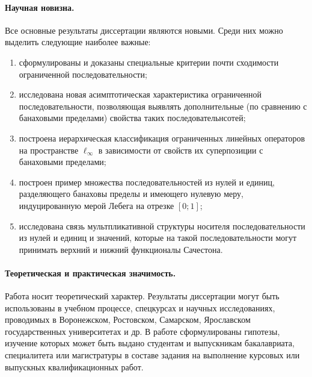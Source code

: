\paragraph{Научная новизна.}
Все основные результаты диссертации являются новыми.
Среди них можно выделить следующие наиболее важные:
\begin{enumerate}
	\item
		сформулированы и доказаны специальные критерии почти сходимости
		ограниченной последовательности;
	\item
		исследована новая асимптотическая характеристика ограниченной последовательности,
		позволяющая выявлять дополнительные (по сравнению с банаховыми пределами)
		свойства таких последовательнсотей;
	\item
		построена иерархическая классификация ограниченных линейных операторов
		на пространстве $\ell_\infty$ в зависимости от свойств их суперпозиции с банаховыми пределами;
	\item
		построен пример множества последовательностей из нулей и единиц, разделяющего банаховы пределы
		и имеющего нулевую меру, индуцированную мерой Лебега на отрезке $[0;1]$;
	\item
		исследована связь мультпликативной структуры носителя последовательности из нулей и единиц
		и значений, которые на такой последовательности могут принимать верхний и нижний функционалы Сачестона.
\end{enumerate}


\paragraph{Теоретическая и практическая значимость.}
Работа носит теоретический характер.
Результаты диссертации могут быть использованы в учебном процессе, спецкурсах и научных исследованиях,
проводимых в Воронежском, Ростовском, Самарском, Ярославском государственных университетах и др.
В работе сформулированы гипотезы, изучение которых может быть выдано студентам и выпускникам бакалавриата, специалитета или магистратуры
в составе задания на выполнение курсовых или выпускных квалификационных работ.



